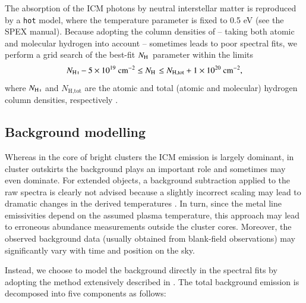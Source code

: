 \documentclass{aa}
\begin{document}
The absorption of the ICM photons by neutral interstellar matter is reproduced by a \texttt{hot} model, where the temperature parameter is fixed to 0.5 eV (see the SPEX manual). Because adopting the column densities of \citet{2013MNRAS.431..394W} -- taking  both  atomic and molecular hydrogen into account -- sometimes leads to poor spectral fits, we perform a grid search of the best-fit $N_\ion{H}{}$ parameter within the limits
\begin{equation}\label{eq:N_H}
N_\ion{H}{i} - 5\times 10^{19} \text{ cm}^{-2} \le N_\ion{H}{} \le N_\text{H,tot} + 1 \times 10^{20} \text{ cm}^{-2},
\end{equation}
where $N_\ion{H}{i}$ and $N_\text{H,tot}$ are the atomic and total (atomic and molecular) hydrogen column densities, respectively \citep[for further details, see][]{2016A&A...592A.157M}.







\subsection{Background modelling}\label{sect:bg_mod}

Whereas in the core of bright clusters the ICM emission is largely dominant, in cluster outskirts the background plays an important role and sometimes may even dominate. For extended objects, a background subtraction applied to the raw spectra is clearly not advised because a slightly incorrect scaling may lead to dramatic changes in the derived temperatures \citep{2006A&A...452..397D}. In turn, since the metal line emissivities depend on the assumed plasma temperature, this approach may lead to erroneous abundance measurements outside the cluster cores. Moreover, the observed background data (usually obtained from blank-field observations) may significantly vary with time and position on the sky.

Instead, we choose to model the background directly in the spectral fits by adopting the method extensively described in \citet{2015A&A...575A..37M}. The total background emission is decomposed into five components as follows:
\end{document}
